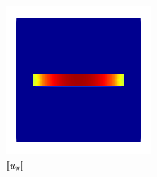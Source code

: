 \begin{frame}
{\begin{figure}
\begin{subfigure}{0.32\textwidth}
                \caption*{$\left\llbracket u_y\right\rrbracket$}
                \includegraphics[width=0.6\textwidth]{method/figures/w_0.8_w_cti.png}
            \end{subfigure}
            \caption*{}
        \end{figure}
    }
\end{frame}